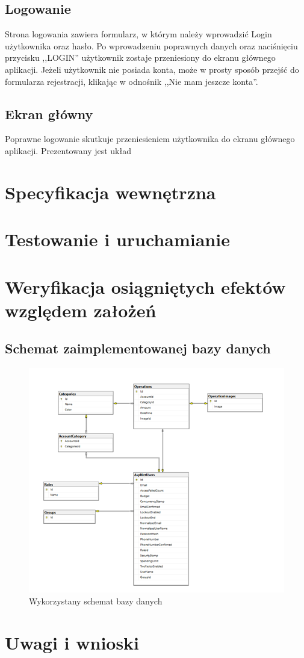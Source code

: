 \documentclass[12pt,a4paper,oneside]{article}
\begin{document}
\subsection{Logowanie}
Strona logowania zawiera formularz, w którym należy wprowadzić Login użytkownika
oraz hasło. Po wprowadzeniu poprawnych danych oraz naciśnięciu przycisku
,,LOGIN'' użytkownik zostaje przeniesiony do ekranu głównego aplikacji.
Jeżeli użytkownik nie posiada konta, może w prosty sposób przejść do formularza
rejestracji, klikając w odnośnik ,,Nie mam jeszcze konta''.

\subsection{Ekran główny}
Poprawne logowanie skutkuje przeniesieniem użytkownika do ekranu głównego 
aplikacji. Prezentowany jest układ 

\section{Specyfikacja wewnętrzna}

\section{Testowanie i uruchamianie}

\section{Weryfikacja osiągniętych efektów względem założeń}
\subsection{Schemat zaimplementowanej bazy danych}
\begin{figure}[H]
    \centering
    \includegraphics[width=\hsize,keepaspectratio]{images/DB2.png}
    \caption{Wykorzystany schemat bazy danych}
\end{figure}

\section{Uwagi i wnioski}
\end{document}
